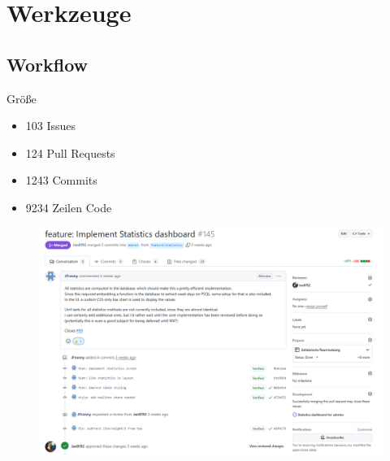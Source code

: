 \section{Werkzeuge}

\subsection{Workflow}
\begin{frame}{Größe}
    \begin{itemize}
        \item 103 Issues
        \item 124 Pull Requests
        \item 1243 Commits
        \item 9234 Zeilen Code
    \end{itemize}
\end{frame}

\begin{frame}[plain]
    \thispagestyle{plain}
    \begin{figure}
        \centering
        \includegraphics[width=1\linewidth]{pictures/pr_reviews}
        \label{fig:pr_reviews}
    \end{figure}
\end{frame}

